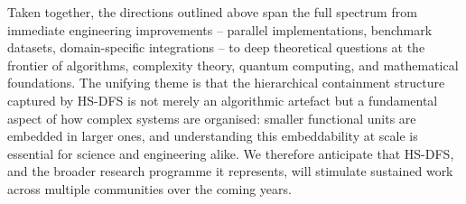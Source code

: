 ﻿\documentclass[12pt,a4paper]{article}
\theoremstyle{plain}
\theoremstyle{definition}
\theoremstyle{remark}
\begin{document}
	Taken together, the directions outlined above span the full spectrum from
	immediate engineering improvements -- parallel implementations, benchmark
	datasets, domain-specific integrations -- to deep theoretical questions
	at the frontier of algorithms, complexity theory, quantum computing, and
	mathematical foundations.  The unifying theme is that the hierarchical
	containment structure captured by HS-DFS is not merely an algorithmic
	artefact but a fundamental aspect of how complex systems are organised:
	smaller functional units are embedded in larger ones, and understanding
	this embeddability at scale is essential for science and engineering alike.
	We therefore anticipate that HS-DFS, and the broader research programme
	it represents, will stimulate sustained work across multiple communities
	over the coming years.
\end{document}
